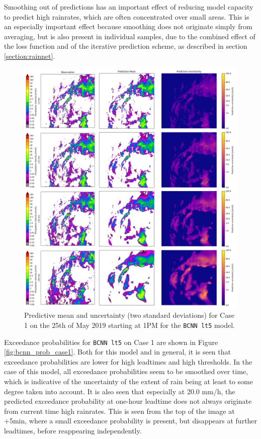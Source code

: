 Smoothing out of predictions has an important effect of reducing model capacity to predict high rainrates, which are often concentrated over small areas. This is an especially important effect because smoothing does not originate simply from averaging, but is also present in individual samples, due to the combined effect of the loss function and of the iterative prediction scheme, as described in section \ref{section:rainnet}. 

\begin{figure}[H]
	\centering
	\includegraphics[width=\textwidth]{images/cases/bcnn_mean_case1}
	\caption{Predictive mean and uncertainty (two standard deviations) for Case 1 on the 25th of May 2019 starting at 1PM for the \texttt{BCNN lt5} model.}
	\label{fig:bcnn_mean_case1}
\end{figure}

Exceedance probabilities for \texttt{BCNN lt5} on Case 1 are shown in Figure \ref{fig:bcnn_prob_case1}. Both for this model and in general, it is seen that exceedance probabilities are lower for high leadtimes and high thresholds. In the case of this model, all exceedance probabilities seem to be smoothed over time, which is indicative of the uncertainty of the extent of rain being at least to some degree taken into account. It is also seen that especially at 20.0 mm/h, the predicted exceedance probability at one-hour leadtime does not always originate from current time high rainrates. This is seen from the top of the image at +5min, where a small exceedance probability is present, but disappears at further leadtimes, before reappearing independently. 

